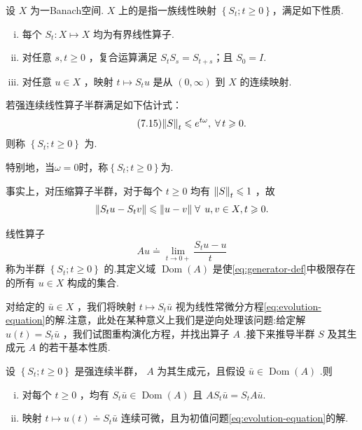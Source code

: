 \begin{definition}[强连续线性算子半群]\label{def:C0-semigroup}
设 $X$ 为一Banach空间. $X$ 上的是指一族线性映射 $\left\{  {{S}_{t};t \geq  0}\right\}$，满足如下性质.
\begin{enumerate}[(i)]
    \item 每个 ${S}_{t} : X \mapsto  X$ 均为有界线性算子.
    \item 对任意 $s,t \geq  0$ ，复合运算满足 ${S}_{t}{S}_{s} = {S}_{t + s}$；且 ${S}_{0} = I$.
    \item 对任意 $u \in  X$ ，映射 $t \mapsto  {S}_{t}u$ 是从 $(0,\infty )$ 到 $X$ 的连续映射.
\end{enumerate}
\end{definition}
\begin{definition}\label{def:semigroup-type}
    若强连续线性算子半群满足如下估计式：
    \begin{equation}\tag{7.15}\label{eq:semigroup-type}
\norm{S}_{t} \leqslant  {e}^{t\omega },\;\forall\,t \geqslant  0.
\end{equation}
    则称 $\left\{  {{S}_{t};t \geq  0}\right\}$ 为.\par
    特别地，当$\omega = 0$时，称$\left\{{{S}_{t};t \geq  0}\right\}$为.
\end{definition}
事实上，对压缩算子半群，对于每个 $t \geq  0$ 均有 $\norm{S}_{t} \leqslant  1$ ，故
\[
\norm{{S}_{t}u - {S}_{t}v} \leqslant  \| u - v\| \;\forall\,\;u,v \in  X,t \geqslant  0.
\]
\begin{definition}[算子半群的生成元]
    线性算子
\begin{equation}\tag{7.16}\label{eq:generator-def}
{Au} \doteq  \mathop{\lim }\limits_{{t \rightarrow  0 + }}\frac{{S}_{t}u - u}{t}
\end{equation}
称为半群 $\left\{  {{S}_{t};t \geq  0}\right\}$ 的.其定义域 $\operatorname{Dom}\left( A\right)$ 是使\eqref{eq:generator-def}中极限存在的所有 $u \in  X$ 构成的集合.
\end{definition}



对给定的 $\bar{u} \in  X$ ，我们将映射 $t \mapsto  {S}_{t}\bar{u}$ 视为线性常微分方程\eqref{eq:evolution-equation}的解.注意，此处在某种意义上我们是逆向处理该问题:给定解 $u\left( t\right)  = {S}_{t}\bar{u}$ ，我们试图重构演化方程，并找出算子 $A$ .接下来推导半群 $S$ 及其生成元 $A$ 的若干基本性质.


\begin{theorem}[半群的性质]\label{thm:semigroup-properties}
设 $\left\{  {{S}_{t};t \geq  0}\right\}$ 是强连续半群， $A$ 为其生成元，且假设 $\bar{u} \in  \operatorname{Dom}\left( A\right)$ .则
\begin{enumerate}[(i)]
    \item 对每个 $t \geq  0$ ，均有 ${S}_{t}\bar{u} \in  \operatorname{Dom}\left( A\right)$ 且 $A{S}_{t}\bar{u} = {S}_{t}A\bar{u}$.
    \item 映射 $t \mapsto  u\left( t\right)  \doteq  {S}_{t}\bar{u}$ 连续可微，且为初值问题\eqref{eq:evolution-equation}的解.
\end{enumerate}
\end{theorem}

